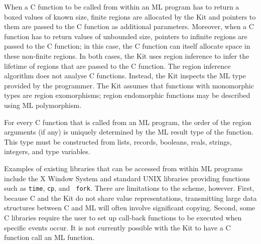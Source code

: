\documentclass[12pt]{book}
\begin{document}
When a C function to be called from within an ML program has to return
a boxed values of known size, finite regions are allocated by the Kit
and pointers to them are passed to the C function as additional
parameters. Moreover, when a C function has to return values of
unbounded size, pointers to infinite regions are passed to the C
function; in this case, the C function can itself allocate space in
these non-finite regions. In both cases, the Kit uses region inference
to infer the lifetime of regions that are passed to the C function.
The region inference algorithm does not analyse C functions. Instead,
the Kit inspects the ML type provided by the programmer. The Kit
assumes that functions with monomorphic types are region exomorphisms; region
endomorphic functions may be described using ML polymorphism.

For every C function that is called from an ML program, the order of the
region arguments (if any) is uniquely determined by the ML result type
of the function.  This type must be constructed from lists, records,
booleans, reals, strings, integers, and type variables.


Examples of existing libraries that can be accessed from within ML
programs include the X Window System and standard UNIX libraries
providing functions such as {\tt time}, {\tt cp}, and {\tt
fork}. There are limitations to the scheme, however. First, because C
and the Kit do not share value representations, transmitting large
data structures between C and ML will often involve significant
copying. Second, some C libraries require the user to set up
call-back functions to be executed when
specific events occur. It is not currently possible with the Kit to
have a C function call an ML function.

\end{document}
